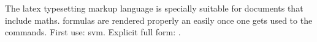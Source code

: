 The \Gls{latex} typesetting markup language is specially suitable 
for documents that include \gls{maths}. \Glspl{formula} are rendered 
properly an easily once one gets used to the commands.
First use: \gls{svm}. Explicit full form: .

\printglossaries